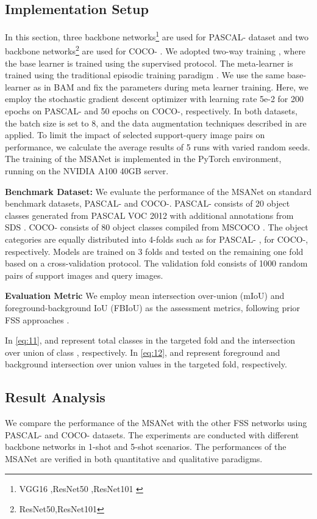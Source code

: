 \documentclass[10pt,twocolumn,letterpaper]{article}
\begin{document}
\subsection{Implementation Setup}
In this section, three backbone networks\footnote{VGG16 \cite{vgg},ResNet50 \cite{resnet},ResNet101 \cite{resnet}} are used for PASCAL- \cite{FSS1shaban} dataset and two backbone networks\footnote{ResNet50,ResNet101} are used for COCO- \cite{coco20}. We adopted two-way training \cite{BAM}, where the base learner is trained using the supervised protocol. The meta-learner is trained using the traditional episodic training paradigm \cite{FSS17prototypical}. We use the same base-learner as in BAM and fix the parameters during meta learner training. Here, we employ the stochastic gradient descent optimizer with learning rate 5e-2 for 200 epochs on PASCAL- and 50 epochs on COCO-, respectively. In both datasets, the batch size is set to 8, and the data augmentation techniques described in \cite{FSS2PFE} are applied. To limit the impact of selected support-query image pairs on performance, we calculate the average results of 5 runs with varied random seeds. The training of the MSANet is implemented in the PyTorch environment, running on the NVIDIA A100 40GB server.

\textbf{Benchmark Dataset:}
We evaluate the performance of the MSANet on standard benchmark datasets, PASCAL- and COCO-. PASCAL- consists of 20 object classes generated from PASCAL VOC 2012 \cite{pascal} with additional annotations from SDS \cite{SDS}. COCO- consists of 80 object classes compiled from MSCOCO \cite{coco}. The object categories are equally distributed into 4-folds such as  for PASCAL- ,  for  COCO-, respectively. Models are trained on 3 folds and tested on the remaining one fold based on a cross-validation protocol. The validation fold consists of 1000 random pairs of support images and query images.

\textbf{Evaluation Metric}
We employ mean intersection over-union (mIoU) and foreground-background IoU (FBIoU) as the assessment metrics, following prior FSS approaches \cite{FSS2PFE,FSS21canet,BAM,FSS9Hsnet}. 


In \cref{eq:11},  and  represent total classes in the targeted fold and the intersection over union of class , respectively. In \cref{eq:12},  and  represent foreground and background intersection over union values in the targeted fold, respectively.
\subsection{Result Analysis}
We compare the performance of the MSANet with the other FSS networks using PASCAL- and COCO- datasets. The experiments are conducted with different backbone networks in 1-shot and 5-shot scenarios. The performances of the MSANet are verified in both quantitative and qualitative paradigms. 
\end{document}
